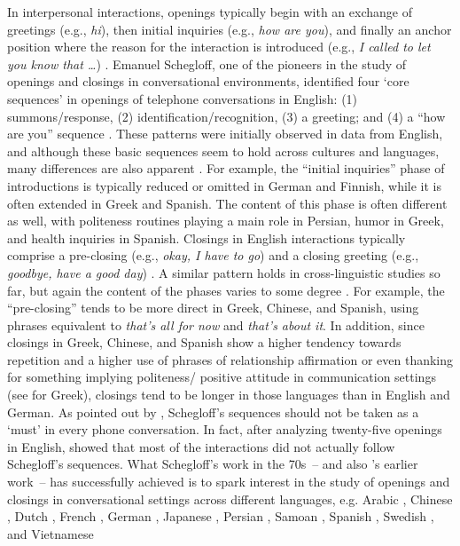 \documentclass[output=paper,colorlinks,citecolor=brown]{langscibook}
\begin{document}
 In interpersonal interactions, openings typically begin with an exchange of greetings (e.g., \textit{hi}), then initial inquiries (e.g., \textit{how are you}), and finally an anchor position where the reason for the interaction is introduced (e.g., \textit{I called to let you know that …}) \parencite {schegloff_sequencing_1968}. Emanuel Schegloff, one of the pioneers in the study of openings and closings in conversational environments, identified four ‘core sequences’ in openings of telephone conversations in English: (1) summons/response, (2) identification/recognition, (3) a greeting; and (4) a ``how are you'' sequence \parencite {schegloff_sequencing_1968,schegloff_identification_1979}. These patterns were initially observed in data from English, and although these basic sequences seem to hold across cultures and languages, many differences are also apparent \parencite {luke_initiation_2002,pavlidou_phases_2014}. For example, the “initial inquiries” phase of introductions is typically reduced or omitted in German and Finnish, while it is often extended in Greek and Spanish. The content of this phase is often different as well, with politeness routines playing a main role in Persian, humor in Greek, and health inquiries in Spanish. Closings in English interactions typically comprise a pre-closing (e.g., \textit{okay, I have to go}) and a closing greeting (e.g., \textit{goodbye, have a good day}) \parencite {schegloff_opening_1973}. A similar pattern holds in cross-linguistic studies so far, but again the content of the phases varies to some degree \parencite {luke_initiation_2002, pavlidou_phases_2014}. For example, the “pre-closing” tends to be more direct in Greek, Chinese, and Spanish, using phrases equivalent to \textit{that’s all for now} and \textit{that’s about it}. In addition, since closings in Greek, Chinese, and Spanish show a higher tendency towards repetition and a higher use of phrases of relationship affirmation or even thanking for something implying politeness/ positive attitude in communication settings (see \cite{gkouma__2023} for Greek), closings tend to be longer in those languages than in English and German. As pointed out by \textcite{Marquez_telephone_2010}, Schegloff’s sequences should not be taken as a ‘must’ in every phone conversation. In fact, after analyzing twenty-five openings in English, \textcite{hopper_speech_1989} showed that most of the interactions did not actually follow Schegloff’s sequences. What Schegloff’s work in the 70s~-- and also \textcite{sacks_harvey_1967}'s earlier work~-- has successfully achieved is to spark interest in the study of openings and closings in conversational settings across different languages, e.g. Arabic \parencite{hopper_telephone_1989}, Chinese \parencite{hopper_chia-hui_chen_languages_1996,luke_initiation_2002}, Dutch \parencite{houtkoop-steenstra_opening_1991,houtkoop-steenstra_questioning_2002}, French \parencite{godard_same_1977,hopper_telephone_1989}, German \parencite{pavlidou_contrasting_1994,pavlidou_last_1997}, Japanese \parencite{park_recognition_2002}, Persian \parencite{taleghani-nikazm_conversation_2002}, Samoan \parencite{soo_telephone_2000}, Spanish \parencite{coronel-molina_openings_1998}, Swedish \parencite{lindstrom_identification_1994}, and Vietnamese \parencite{do_vietnamese_2018} 
\end{document}
